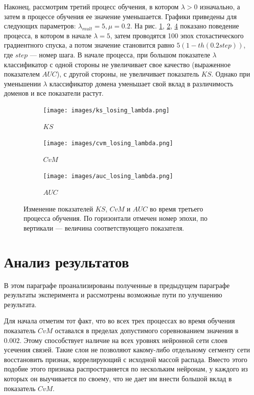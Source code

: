 \documentclass[14pt, a4paper]{extarticle}
\begin{document}
Наконец, рассмотрим третий процесс обучения, в котором $\lambda > 0$ изначально, а затем в процессе обучения ее значение уменьшается. Графики приведены для следующих параметров: $\lambda_{mult} = 5, \mu = 0.2$. На рис. \ref{figure:losing_lambda_results_ks}, \ref{figure:losing_lambda_results_cvm}, \ref{figure:losing_lambda_results_auc} показано поведение процесса, в котором в начале $\lambda=5$, затем проводятся 100 эпох стохастического градиентного спуска, а потом значение становится равно $5(1 - th(0.2step))$, где $step$ — номер шага. В начале процесса, при большом показателе $\lambda$ классификатор с одной стороны не увеличивает свое качество (выраженное показателем $AUC$), с другой стороны, не увеличивает показатель $KS$. Однако при уменьшении $\lambda$ классификатор домена уменьшает свой вклад в различимость доменов и все показатели растут.

\begin{figure}[!h]
\begin{subfigure}{.5\textwidth}
	\centering
	\texttt{[image: images/ks\_losing\_lambda.png]}
	\caption{$KS$}
	\label{figure:losing_lambda_results_ks}
\end{subfigure}
\begin{subfigure}{.5\textwidth}
	\centering
	\texttt{[image: images/cvm\_losing\_lambda.png]}
	\caption{$CvM$}
	\label{figure:losing_lambda_results_cvm}
\end{subfigure}
\begin{subfigure}{.5\textwidth}
	\centering
	\texttt{[image: images/auc\_losing\_lambda.png]}
	\caption{$AUC$}
	\label{figure:losing_lambda_results_auc}
\end{subfigure}
\captionsetup{font=small}
\caption{Изменение показателей $KS$, $CvM$ и $AUC$ во время третьего процесса обучения.
По горизонтали отмечен номер эпохи, по вертикали — величина соответствующего показателя.}
\end{figure}

\section{Анализ результатов}
\label{paragraph:analysis}

В этом параграфе проанализированы полученные в предыдущем параграфе результаты эксперимента и рассмотрены возможные пути по улучшению результата.

Для начала отметим тот факт, что во всех трех процессах во время обучения показатель $CvM$ оставался в пределах допустимого соревнованием значения в $0.002$. Этому способствует наличие на всех уровнях нейронной сети слоев усечения связей. Такие слои не позволяют какому-либо отдельному сегменту сети восстановить признак, коррелирующий с исходной массой распада. Вместо этого подобие этого признака распространяется по нескольким нейронам, у каждого из которых он выучивается по своему, что не дает им внести большой вклад в показатель $CvM$.
\end{document}

